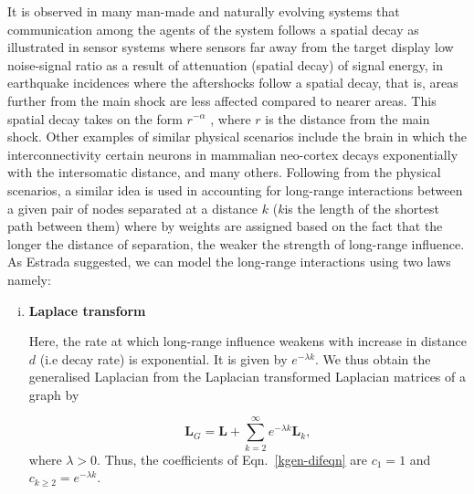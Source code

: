 \documentclass[10pt,a4paper]{article}
\theoremstyle{plain}
\theoremstyle{definition}
\begin{document}
\begin{enumerate}[1)]
    	    	It is observed in many man-made and naturally evolving systems that communication among the agents of the system follows a spatial decay as illustrated in sensor systems where sensors far away from the target display low noise-signal ratio as a result of attenuation (spatial decay) of signal energy, in earthquake incidences where the aftershocks follow a spatial decay, that is, areas further from the main shock are less affected compared to nearer areas.
    	    	 This spatial decay takes on the form $r ^{-\alpha}$ , where $r$ is the distance from the main shock. 
    	    	Other examples of similar physical scenarios include the brain in which the interconnectivity certain neurons in mammalian neo-cortex decays exponentially with the intersomatic distance, and many others.  Following from the physical scenarios, a similar idea is used in accounting for long-range interactions between a given pair of nodes separated at a distance $k$ ($k$is the length of the shortest path between them) where by weights are assigned based on the fact that the longer the distance of separation, the weaker the strength of long-range influence. As Estrada \citep{estrada2012path} suggested, we can model the long-range interactions using two laws namely:
    	    	
    	        \begin{enumerate}[i)]
    	    	\item \textbf{Laplace transform}
    	    	
    	    	Here, the rate at which long-range influence weakens with increase in distance $d$ (i.e decay rate) is exponential. It is given by $e^{-\lambda k}$.
    	    	We thus obtain the generalised Laplacian from the Laplacian transformed Laplacian matrices of a graph by
    	    	
    	    	\begin{equation}
    	    	\mathbf{L}_{G} = \mathbf{L} + \sum_{k=2}^{\infty} e^{-\lambda k} \mathbf{L}_k, 
    	    	\label{laplacetransform}
    	    	\end{equation}
    	    	where $\lambda >0$.
    	    	Thus, the coefficients of Eqn.~\ref{kgen-difeqn} are $c_1 = 1$ and $c_{k \geq 2} = e^{-\lambda k}$.
				

\end{enumerate}
\end{enumerate}
\end{document}

